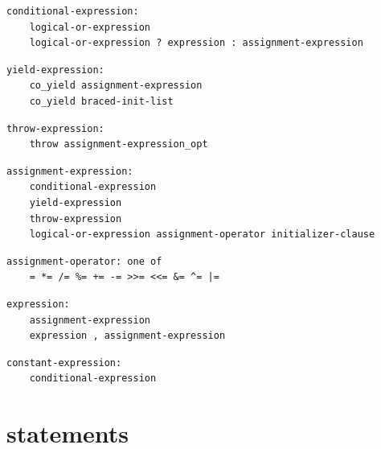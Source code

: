 \noindent\textbf{\texttt{}}\par
\begin{lstlisting}
conditional-expression:
    logical-or-expression
    logical-or-expression ? expression : assignment-expression
\end{lstlisting}

\noindent\textbf{\texttt{}}\par
\begin{lstlisting}
yield-expression:
    co_yield assignment-expression
    co_yield braced-init-list
\end{lstlisting}

\noindent\textbf{\texttt{}}\par
\begin{lstlisting}
throw-expression:
    throw assignment-expression_opt
\end{lstlisting}

\noindent\textbf{\texttt{}}\par
\begin{lstlisting}
assignment-expression:
    conditional-expression
    yield-expression
    throw-expression
    logical-or-expression assignment-operator initializer-clause
\end{lstlisting}

\noindent\textbf{\texttt{}}\par
\begin{lstlisting}
assignment-operator: one of
    = *= /= %= += -= >>= <<= &= ^= |=
\end{lstlisting}

\noindent\textbf{\texttt{}}\par
\begin{lstlisting}
expression:
    assignment-expression
    expression , assignment-expression
\end{lstlisting}

\noindent\textbf{\texttt{}}\par
\begin{lstlisting}
constant-expression:
    conditional-expression
\end{lstlisting}

\section{statements}

